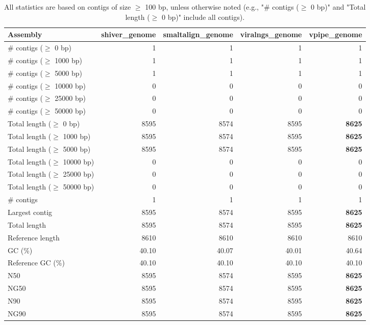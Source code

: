 \documentclass[12pt,a4paper]{article}
\begin{document}
\begin{table}[ht]
\begin{center}
\caption{All statistics are based on contigs of size $\geq$ 100 bp, unless otherwise noted (e.g., "\# contigs ($\geq$ 0 bp)" and "Total length ($\geq$ 0 bp)" include all contigs).}
\begin{tabular}{|l*{4}{|r}|}
\hline
Assembly & shiver\_genome & smaltalign\_genome & viralngs\_genome & vpipe\_genome \\ \hline
\# contigs ($\geq$ 0 bp) & 1 & 1 & 1 & 1 \\ \hline
\# contigs ($\geq$ 1000 bp) & 1 & 1 & 1 & 1 \\ \hline
\# contigs ($\geq$ 5000 bp) & 1 & 1 & 1 & 1 \\ \hline
\# contigs ($\geq$ 10000 bp) & 0 & 0 & 0 & 0 \\ \hline
\# contigs ($\geq$ 25000 bp) & 0 & 0 & 0 & 0 \\ \hline
\# contigs ($\geq$ 50000 bp) & 0 & 0 & 0 & 0 \\ \hline
Total length ($\geq$ 0 bp) & 8595 & 8574 & 8595 & {\bf 8625} \\ \hline
Total length ($\geq$ 1000 bp) & 8595 & 8574 & 8595 & {\bf 8625} \\ \hline
Total length ($\geq$ 5000 bp) & 8595 & 8574 & 8595 & {\bf 8625} \\ \hline
Total length ($\geq$ 10000 bp) & 0 & 0 & 0 & 0 \\ \hline
Total length ($\geq$ 25000 bp) & 0 & 0 & 0 & 0 \\ \hline
Total length ($\geq$ 50000 bp) & 0 & 0 & 0 & 0 \\ \hline
\# contigs & 1 & 1 & 1 & 1 \\ \hline
Largest contig & 8595 & 8574 & 8595 & {\bf 8625} \\ \hline
Total length & 8595 & 8574 & 8595 & {\bf 8625} \\ \hline
Reference length & 8610 & 8610 & 8610 & 8610 \\ \hline
GC (\%) & 40.10 & 40.07 & 40.01 & 40.64 \\ \hline
Reference GC (\%) & 40.10 & 40.10 & 40.10 & 40.10 \\ \hline
N50 & 8595 & 8574 & 8595 & {\bf 8625} \\ \hline
NG50 & 8595 & 8574 & 8595 & {\bf 8625} \\ \hline
N90 & 8595 & 8574 & 8595 & {\bf 8625} \\ \hline
NG90 & 8595 & 8574 & 8595 & {\bf 8625} \\ \hline

\end{tabular}
\end{center}
\end{table}
\end{document}

